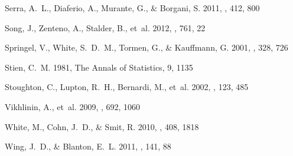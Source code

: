 \documentclass[iop]{emulateapj}
\begin{document}
\begin{thebibliography}{42}
{Serra}, A.~L., {Diaferio}, A., {Murante}, G., \& {Borgani}, S. 2011, \mnras,
  412, 800

{Song}, J., {Zenteno}, A., {Stalder}, B., {et~al.} 2012, \apj, 761, 22

{Springel}, V., {White}, S.~D.~M., {Tormen}, G., \& {Kauffmann}, G. 2001,
  \mnras, 328, 726

{Stien}, C.~M. 1981, The Annals of Statistics, 9, 1135

{Stoughton}, C., {Lupton}, R.~H., {Bernardi}, M., {et~al.} 2002, \aj, 123, 485

{Vikhlinin}, A., {et~al.} 2009, \apj, 692, 1060

{White}, M., {Cohn}, J.~D., \& {Smit}, R. 2010, \mnras, 408, 1818

{Wing}, J.~D., \& {Blanton}, E.~L. 2011, \aj, 141, 88

\end{thebibliography}
\end{document}
